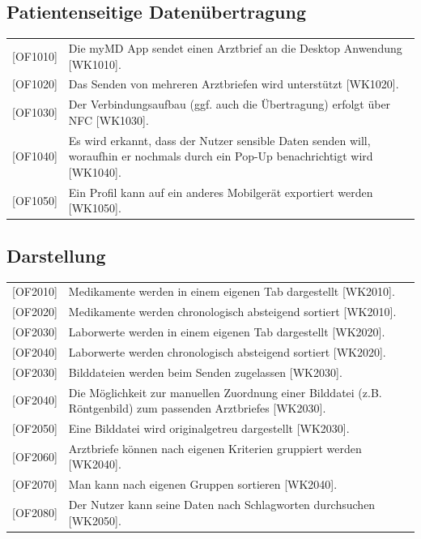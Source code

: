 \documentclass[a4paper]{scrreprt}
\begin{document}
\subsection{Patientenseitige Datenübertragung}
\begin{tabular}{lll}
[OF1010]&  \multicolumn{2}{p{12cm}}{Die myMD \gls{App} sendet einen Arztbrief an die \gls{Desktop Anwendung} [WK1010].}\\
{[OF1020]} &  \multicolumn{2}{p{12cm}}{Das Senden von mehreren Arztbriefen wird unterstützt [WK1020].}  \\
{[OF1030]} &  \multicolumn{2}{p{12cm}}{Der Verbindungsaufbau (ggf. auch die Übertragung) erfolgt über \gls{NFC} [WK1030].}  \\
{[OF1040]} &  \multicolumn{2}{p{12cm}}{Es wird erkannt, dass der Nutzer sensible Daten senden will, woraufhin er nochmals durch ein Pop-Up benachrichtigt wird [WK1040].}  \\
{[OF1050]} &  \multicolumn{2}{p{12cm}}{Ein Profil kann auf ein anderes Mobilgerät exportiert werden [WK1050].}  \\

\end{tabular}

\subsection{Darstellung}
\begin{tabular}{lll}
[OF2010]&  \multicolumn{2}{p{12cm}}{Medikamente werden in einem eigenen \gls{Tab} dargestellt [WK2010].}\\
{[OF2020]}&  \multicolumn{2}{p{12cm}}{Medikamente werden chronologisch absteigend sortiert [WK2010].}\\
{[OF2030]}&  \multicolumn{2}{p{12cm}}{Laborwerte werden in einem eigenen \gls{Tab} dargestellt [WK2020].}\\
{[OF2040]}&  \multicolumn{2}{p{12cm}}{Laborwerte werden chronologisch absteigend sortiert [WK2020].}\\
{[OF2030]} &  \multicolumn{2}{p{12cm}}{Bilddateien werden beim Senden zugelassen [WK2030].}  \\
{[OF2040]} &  \multicolumn{2}{p{12cm}}{Die Möglichkeit zur manuellen Zuordnung einer Bilddatei (z.B. Röntgenbild) zum passenden Arztbriefes [WK2030].}  \\
{[OF2050]} &  \multicolumn{2}{p{12cm}}{Eine Bilddatei wird originalgetreu dargestellt [WK2030].}  \\
{[OF2060]} &  \multicolumn{2}{p{12cm}}{Arztbriefe können nach eigenen Kriterien gruppiert werden [WK2040].}  \\
{[OF2070]} &  \multicolumn{2}{p{12cm}}{Man kann nach eigenen Gruppen sortieren [WK2040].}  \\
{[OF2080]} &  \multicolumn{2}{p{12cm}}{Der Nutzer kann seine Daten nach Schlagworten durchsuchen [WK2050].}  \\

\end{tabular}
\end{document}
